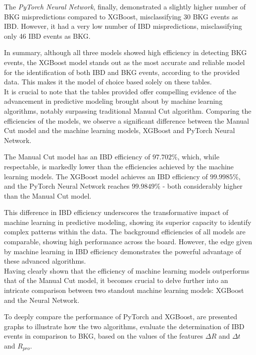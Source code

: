 The \textit{PyTorch Neural Network}, finally, demonstrated a slightly higher number of BKG mispredictions compared to XGBoost, misclassifying 30 BKG events as IBD. However, it had a very low number of IBD mispredictions, misclassifying only 46 IBD events as BKG.

In summary, although all three models showed high efficiency in detecting BKG events, the XGBoost model stands out as the most accurate and reliable model for the identification of both IBD and BKG events, according to the provided data. This makes it the model of choice based solely on these tables.\\



It is crucial to note that the tables provided offer compelling evidence of the advancement in predictive modeling brought about by machine learning algorithms, notably surpassing traditional Manual Cut algorithm. Comparing the efficiencies of the models, we observe a significant difference between the Manual Cut model and the machine learning models, XGBoost and PyTorch Neural Network.

The Manual Cut model has an IBD efficiency of $97.702\%$, which, while respectable, is markedly lower than the efficiencies achieved by the machine learning models. The XGBoost model achieves an IBD efficiency of $99.9985\%$, and the PyTorch Neural Network reaches $99.9849\%$ - both considerably higher than the Manual Cut model.

This difference in IBD efficiency underscores the transformative impact of machine learning in predictive modeling, showing its superior capacity to identify complex patterns within the data. The background efficiencies of all models are comparable, showing high performance across the board. However, the edge given by machine learning in IBD efficiency demonstrates the powerful advantage of these advanced algorithms.\\

Having clearly shown that the efficiency of machine learning models outperforms that of the Manual Cut model, it becomes crucial to delve further into an intricate comparison between two standout machine learning models: XGBoost and the Neural Network.

To deeply compare the performance of PyTorch and XGBoost, are presented graphs to illustrate how the two algorithms, evaluate the determination of IBD events in comparison to BKG, based on the values of the features $\Delta R$ and $\Delta t$ and $R_{pro}$.


